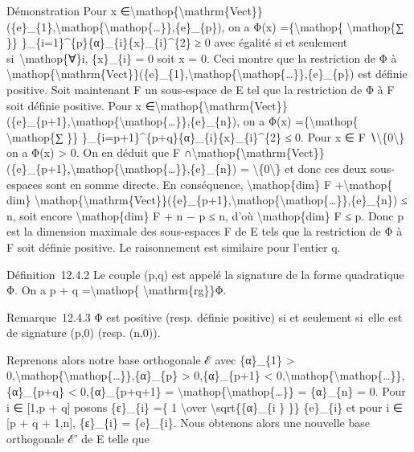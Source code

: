 \documentclass[]{article}
\begin{document}
Démonstration Pour x
∈\textbackslash{}mathop\{\textbackslash{}mathrm\{Vect\}\}(\{e\}\_\{1\},\textbackslash{}mathop\{\textbackslash{}mathop\{\ldots{}\}\},\{e\}\_\{p\}),
on a Φ(x) =\{\textbackslash{}mathop\{ \textbackslash{}mathop\{∑ \}\}
\}\_\{i=1\}\^{}\{p\}\{α\}\_\{i\}\{x\}\_\{i\}\^{}\{2\} ≥ 0 avec égalité
si et seulement si~\textbackslash{}mathop\{∀\}i, \{x\}\_\{i\} = 0 soit x
= 0. Ceci montre que la restriction de Φ à
\textbackslash{}mathop\{\textbackslash{}mathrm\{Vect\}\}(\{e\}\_\{1\},\textbackslash{}mathop\{\textbackslash{}mathop\{\ldots{}\}\},\{e\}\_\{p\})
est définie positive. Soit maintenant F un sous-espace de E tel que la
restriction de Φ à F soit définie positive. Pour x
∈\textbackslash{}mathop\{\textbackslash{}mathrm\{Vect\}\}(\{e\}\_\{p+1\},\textbackslash{}mathop\{\textbackslash{}mathop\{\ldots{}\}\},\{e\}\_\{n\}),
on a Φ(x) =\{\textbackslash{}mathop\{ \textbackslash{}mathop\{∑ \}\}
\}\_\{i=p+1\}\^{}\{p+q\}\{α\}\_\{i\}\{x\}\_\{i\}\^{}\{2\} ≤ 0. Pour x ∈
F ∖\textbackslash{}\{0\textbackslash{}\} on a Φ(x) \textgreater{} 0. On
en déduit que F
∩\textbackslash{}mathop\{\textbackslash{}mathrm\{Vect\}\}(\{e\}\_\{p+1\},\textbackslash{}mathop\{\textbackslash{}mathop\{\ldots{}\}\},\{e\}\_\{n\})
= \textbackslash{}\{0\textbackslash{}\} et donc ces deux sous-espaces
sont en somme directe. En conséquence, \textbackslash{}mathop\{dim\} F
+\textbackslash{}mathop\{ dim\}
\textbackslash{}mathop\{\textbackslash{}mathrm\{Vect\}\}(\{e\}\_\{p+1\},\textbackslash{}mathop\{\textbackslash{}mathop\{\ldots{}\}\},\{e\}\_\{n\})
≤ n, soit encore \textbackslash{}mathop\{dim\} F + n − p ≤ n, d'où
\textbackslash{}mathop\{dim\} F ≤ p. Donc p est la dimension maximale
des sous-espaces F de E tels que la restriction de Φ à F soit définie
positive. Le raisonnement est similaire pour l'entier q.

Définition~12.4.2 Le couple (p,q) est appelé la signature de la forme
quadratique Φ. On a p + q =\textbackslash{}mathop\{
\textbackslash{}mathrm\{rg\}\}Φ.

Remarque~12.4.3 Φ est positive (resp. définie positive) si et seulement
si~elle est de signature (p,0) (resp. (n,0)).

Reprenons alors notre base orthogonale ℰ avec \{α\}\_\{1\}
\textgreater{}
0,\textbackslash{}mathop\{\textbackslash{}mathop\{\ldots{}\}\},\{α\}\_\{p\}
\textgreater{} 0,\{α\}\_\{p+1\} \textless{}
0,\textbackslash{}mathop\{\textbackslash{}mathop\{\ldots{}\}\},\{α\}\_\{p+q\}
\textless{} 0,\{α\}\_\{p+q+1\} =
\textbackslash{}mathop\{\textbackslash{}mathop\{\ldots{}\}\} =
\{α\}\_\{n\} = 0. Pour i ∈ {[}1,p + q{]} posons \{ε\}\_\{i\} =\{ 1
\textbackslash{}over \textbackslash{}sqrt\{\textbar{}\{α\}\_\{i \}
\textbar{}\}\} \{e\}\_\{i\} et pour i ∈ {[}p + q + 1,n{]}, \{ε\}\_\{i\}
= \{e\}\_\{i\}. Nous obtenons alors une nouvelle base orthogonale ℰ' de
E telle que
\end{document}
